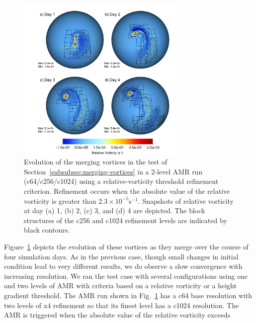 %
\begin{figure}
    \centerline{%
    \noindent
    \includegraphics[width=19pc]{Chap1/amr_daysMerge}}
    \caption{Evolution of the merging vortices in the test of 
Section~\ref{subsubsec:merging-vortices}
in a 2-level AMR run (c64/c256/c1024)
    using a relative-vorticity threshold refinement criterion.
    Refinement occurs when the absolute value of the relative vorticity
    is greater than $2.3 \times 10^{-5} \mathrm{ s}^{-1}$.  Snapshots of relative
    vorticity at day (a) 1, (b) 2, (c) 3, and (d) 4 are depicted.
    The block structures of the c256 and c1024 refinement levels are
    indicated by black contours.}%
    \label{fig:amrmerge_evolve}
\end{figure}
%
Figure~\ref{fig:amrmerge_evolve} depicts the evolution of these vortices as
they merge over the course of four simulation days.  As in the previous case,
though small changes in initial condition lead to very different
results, we do observe a slow convergence with increasing resolution.
We ran the test case with several configurations using one and two
levels of AMR with criteria based on a relative vorticity or a height
gradient threshold.  The AMR run shown in 
Fig.~\ref{fig:amrmerge_evolve} has a c64 base resolution with two levels of
x4 refinement so that its finest level has a c1024 resolution.  The AMR
is triggered when the absolute value of the relative vorticity exceeds
